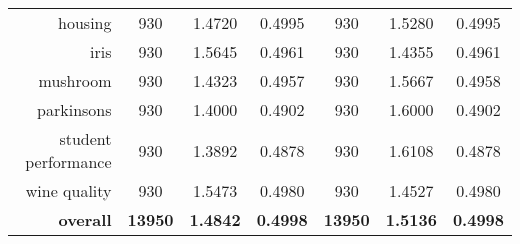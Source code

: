 \begin{table}[htbp]
{\begin{tabular}{rcccccc}
			housing                            & 930                                        & \cellcolor[rgb]{ .776,  .937,  .808}\textcolor[rgb]{ 0,  .38,  0}{1.4720}          & 0.4995          & 930                               & 1.5280                                                                    & 0.4995          \\
			iris                               & 930                                        & 1.5645                                                                             & 0.4961          & 930                               & \cellcolor[rgb]{ .776,  .937,  .808}\textcolor[rgb]{ 0,  .38,  0}{1.4355} & 0.4961          \\
			mushroom                           & 930                                        & \cellcolor[rgb]{ .776,  .937,  .808}\textcolor[rgb]{ 0,  .38,  0}{1.4323}          & 0.4957          & 930                               & 1.5667                                                                    & 0.4958          \\
			parkinsons                         & 930                                        & \cellcolor[rgb]{ .776,  .937,  .808}\textcolor[rgb]{ 0,  .38,  0}{1.4000}          & 0.4902          & 930                               & 1.6000                                                                    & 0.4902          \\
			student performance                & 930                                        & \cellcolor[rgb]{ .776,  .937,  .808}\textcolor[rgb]{ 0,  .38,  0}{1.3892}          & 0.4878          & 930                               & 1.6108                                                                    & 0.4878          \\
			wine quality                       & 930                                        & 1.5473                                                                             & 0.4980          & 930                               & \cellcolor[rgb]{ .776,  .937,  .808}\textcolor[rgb]{ 0,  .38,  0}{1.4527} & 0.4980          \\
			\midrule
			\textbf{overall}                   & \textbf{13950}                             & \cellcolor[rgb]{ .776,  .937,  .808}\textcolor[rgb]{ 0,  .38,  0}{\textbf{1.4842}} & \textbf{0.4998} & \textbf{13950}                    & \textbf{1.5136}                                                           & \textbf{0.4998} \\
		\end{tabular}%
	}
\end{table}%


